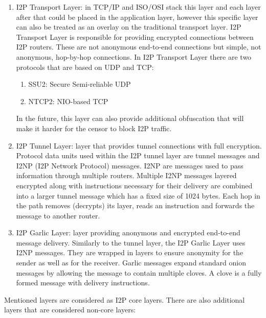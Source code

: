 \begin{enumerate}
    \item I2P Transport Layer: in TCP/IP and ISO/OSI stack this layer and each layer after that could be placed in the application layer, however this specific layer can also be treated as an overlay on the traditional transport layer. I2P Transport Layer is responsible for providing encrypted connections between I2P routers. These are not anonymous end-to-end connections but simple, not anonymous, hop-by-hop connections. In I2P Transport Layer there are two protocols that are based on UDP and TCP:
    \begin{enumerate}
        \item SSU2: Secure Semi-reliable UDP
        \item NTCP2: NIO-based TCP
    \end{enumerate}
In the future, this layer can also provide additional obfuscation that will make it harder for the censor to block I2P traffic.
    \item I2P Tunnel Layer: layer that provides tunnel connections with full encryption. Protocol data units used within the I2P tunnel layer are tunnel messages and I2NP (I2P Network Protocol) messages. I2NP are messages used to pass information through multiple routers. Multiple I2NP messages layered encrypted along with instructions necessary for their delivery are combined into a larger tunnel message which has a fixed size of 1024 bytes. Each hop in the path removes (decrypts) its layer, reads an instruction and forwards the message to another router.
    \item I2P Garlic Layer: layer providing anonymous and encrypted end-to-end message delivery.
    Similarly to the tunnel layer, the I2P Garlic Layer uses I2NP messages. They are wrapped in layers to ensure anonymity for the sender as well as for the receiver. Garlic messages expand standard onion messages by allowing the message to contain multiple cloves. A clove is a fully formed message with delivery instructions.
\end{enumerate}
Mentioned layers are considered as I2P core layers. There are also additional layers that are considered non-core layers:

